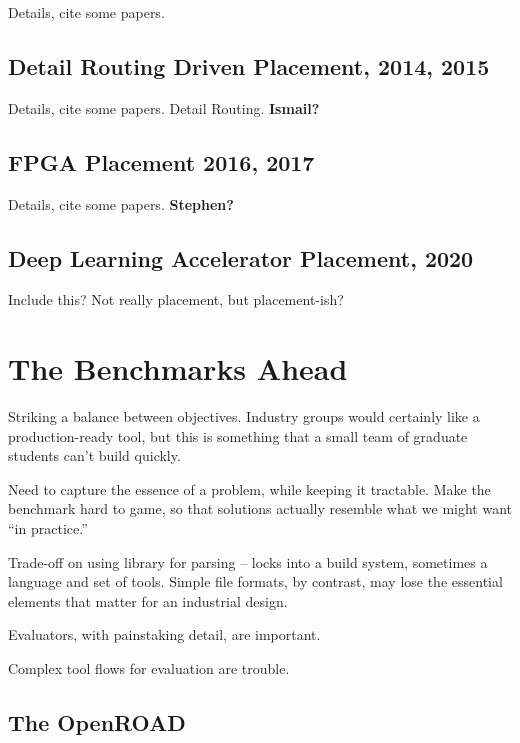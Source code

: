 \documentclass[sigconf]{acmart}
\begin{document}

Details, cite some papers.

\subsection{Detail Routing Driven Placement, 2014, 2015}

Details, cite some papers.
Detail Routing.
{\bf Ismail?}



\subsection{FPGA Placement 2016, 2017}

Details, cite some papers.
{\bf Stephen?}


\subsection{Deep Learning Accelerator Placement, 2020}

Include this?  Not really placement, but placement-ish?


\section{The Benchmarks Ahead}

Striking a balance between objectives.  Industry groups
would certainly like a production-ready tool, but this is
something that a small team of graduate students can't
build quickly.

Need to capture the essence of a problem, while keeping it
tractable.  Make the benchmark hard to game, so that solutions
actually resemble what we might want ``in practice.''

Trade-off on using library for parsing -- locks into a build
system, sometimes a language and set of tools.  Simple
file formats, by contrast, may lose the essential elements
that matter for an industrial design.

Evaluators, with painstaking detail, are important.

Complex tool flows for evaluation are trouble.







\subsection{The OpenROAD}
\end{document}

